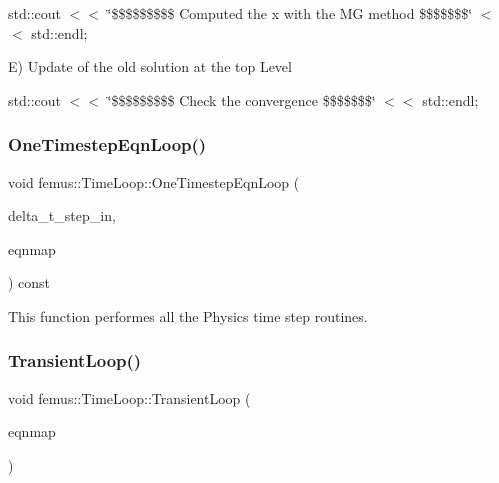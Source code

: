 std\+::cout $<$$<$ \char`\"{}\$\$\$\$\$\$\$\$\$ Computed the x with the M\+G method \$\$\$\$\$\$\$\char`\"{} $<$$<$ std\+::endl;

E) Update of the old solution at the top Level

std\+::cout $<$$<$ \char`\"{}\$\$\$\$\$\$\$\$\$ Check the convergence \$\$\$\$\$\$\$\char`\"{} $<$$<$ std\+::endl; \mbox{\label{classfemus_1_1_time_loop_a08750efcce7382813ae3045385b2693f}} 
\subsubsection{\texorpdfstring{One\+Timestep\+Eqn\+Loop()}{OneTimestepEqnLoop()}}
{\footnotesize\ttfamily void femus\+::\+Time\+Loop\+::\+One\+Timestep\+Eqn\+Loop (\begin{DoxyParamCaption}\item[{const \mbox{\hyperlink{_typedefs_8hpp_a91ad9478d81a7aaf2593e8d9c3d06a14}{uint}}}]{delta\+\_\+t\+\_\+step\+\_\+in,  }\item[{const \mbox{\hyperlink{classfemus_1_1_multi_level_problem}{Multi\+Level\+Problem}} \&}]{eqnmap }\end{DoxyParamCaption}) const}



This function performes all the Physics time step routines. 

\mbox{\label{classfemus_1_1_time_loop_ae06941f0786b5a6f7b5311ed5a4ba352}} 
\subsubsection{\texorpdfstring{Transient\+Loop()}{TransientLoop()}}
{\footnotesize\ttfamily void femus\+::\+Time\+Loop\+::\+Transient\+Loop (\begin{DoxyParamCaption}\item[{const \mbox{\hyperlink{classfemus_1_1_multi_level_problem}{Multi\+Level\+Problem}} \&}]{eqnmap }\end{DoxyParamCaption})}

